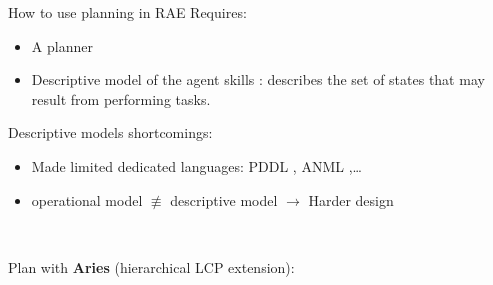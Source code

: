\begin{frame}{How to use planning in RAE}
    Requires:
    \begin{itemize}
        \item A planner
        \item Descriptive model of the agent skills : describes the set of states that may result from performing tasks.
    \end{itemize} 
\pause
    Descriptive models shortcomings:
    \begin{itemize}
        \item Made limited dedicated languages: PDDL \cite{foxPDDL2ExtensionPDDL2003}, ANML \cite{smith2008anml},\dots
        \item operational model $\not\equiv$ descriptive model $\rightarrow$ Harder design
    \end{itemize}

    ~
    \pause
    \centering

    \pause
    Plan with \textbf{Aries} (hierarchical LCP\cite{bit-monnotConstraintBasedEncodingDomainIndependent2018} extension):

\end{frame}

